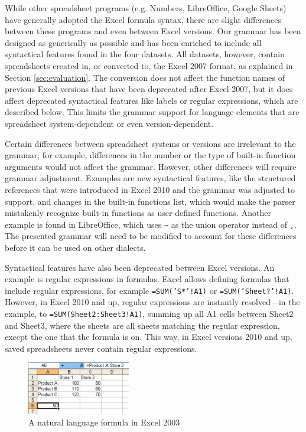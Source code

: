 \documentclass[times]{smrauth}
\begin{document}
While other spreadsheet programs (e.g. Numbers, LibreOffice, Google Sheets) have generally adopted the Excel formula syntax, there are slight differences between these programs and even between Excel versions.
Our grammar has been designed as generically as possible and has been enriched to include all syntactical features found in the four datasets.
All datasets, however, contain spreadsheets created in, or converted to, the Excel 2007 format, as explained in Section \ref{sec:evaluation}.
The conversion does not affect the function names of previous Excel versions that have been deprecated after Excel 2007, but it does affect deprecated syntactical features like labels or regular expressions, which are described below. This limits the grammar support for language elements that are spreadsheet system-dependent or even version-dependent.

Certain differences between spreadsheet systems or versions are irrelevant to the grammar; for example, differences in the number or the type of built-in function arguments would not affect the grammar. However, other differences will require grammar adjustment. Examples are new syntactical features, like the structured references that were introduced in Excel 2010 and the grammar was adjusted to support, and changes in the built-in functions list, which would make the parser mistakenly recognize built-in functions as user-defined functions.
Another example is found in LibreOffice, which uses \texttt{\~} as the union operator instead of \texttt{,}.
The presented grammar will need to be modified to account for these differences before it can be used on other dialects.

Syntactical features have also been deprecated between Excel versions.
An example is regular expressions in formulas.
Excel allows defining formulas that include regular expressions, for example \texttt{=SUM('S*'!A1)} or \texttt{=SUM('Sheet?'!A1)}.
However, in Excel 2010 and up, regular expressions are instantly resolved---in the example, to  \texttt{=SUM(Sheet2:Sheet3!A1)}, summing up all A1 cells between Sheet2 and Sheet3, where the sheets are all sheets matching the regular expression, except the one that the formula is on.
This way, in Excel versions 2010 and up, saved spreadsheets never contain regular expressions.
\begin{figure}
	\centering
	\includegraphics[width=0.4\textwidth]{img/labels}
	\caption{A natural language formula in Excel 2003}
	\label{fig:labels}
\end{figure}
\end{document}
